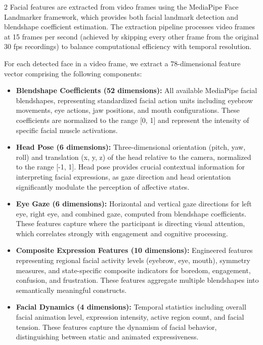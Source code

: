 \begin{multicols}{2}
  Facial features are extracted from video frames using the MediaPipe Face Landmarker framework, which provides both facial landmark detection and blendshape coefficient estimation. The extraction pipeline processes video frames at 15 frames per second (achieved by skipping every other frame from the original 30 fps recordings) to balance computational efficiency with temporal resolution.

  For each detected face in a video frame, we extract a 78-dimensional feature vector comprising the following components:

  \begin{itemize}[leftmargin=*]
    \item \textbf{Blendshape Coefficients (52 dimensions):} All available MediaPipe facial blendshapes, representing standardized facial action units including eyebrow movements, eye actions, jaw positions, and mouth configurations. These coefficients are normalized to the range [0, 1] and represent the intensity of specific facial muscle activations.

    \item \textbf{Head Pose (6 dimensions):} Three-dimensional orientation (pitch, yaw, roll) and translation (x, y, z) of the head relative to the camera, normalized to the range [-1, 1]. Head pose provides crucial contextual information for interpreting facial expressions, as gaze direction and head orientation significantly modulate the perception of affective states.

    \item \textbf{Eye Gaze (6 dimensions):} Horizontal and vertical gaze directions for left eye, right eye, and combined gaze, computed from blendshape coefficients. These features capture where the participant is directing visual attention, which correlates strongly with engagement and cognitive processing.

    \item \textbf{Composite Expression Features (10 dimensions):} Engineered features representing regional facial activity levels (eyebrow, eye, mouth), symmetry measures, and state-specific composite indicators for boredom, engagement, confusion, and frustration. These features aggregate multiple blendshapes into semantically meaningful constructs.

    \item \textbf{Facial Dynamics (4 dimensions):} Temporal statistics including overall facial animation level, expression intensity, active region count, and facial tension. These features capture the dynamism of facial behavior, distinguishing between static and animated expressiveness.
  \end{itemize}


\end{multicols}
